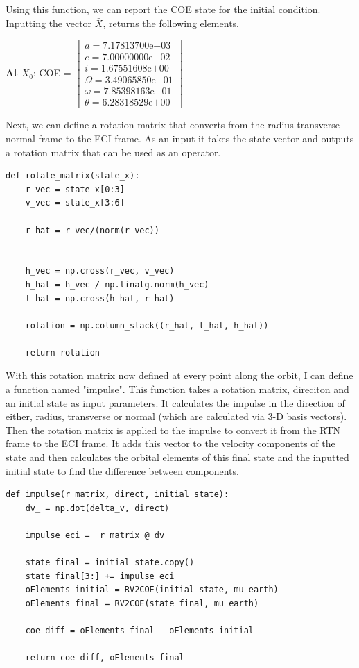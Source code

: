 \documentclass[12pt,twocolumn]{article}  %
\begin{document}
Using this function, we can report the COE state for the initial condition. Inputting the vector $\bar{X}$, returns the following elements.

\begin{center}
    \textbf{At } $X_0$:
    COE =
    $\begin{bmatrix}
    a = 7.17813700\mathrm{e}{+03} \\
    e =  7.00000000\mathrm{e}{-02} \\
    i = 1.67551608\mathrm{e}{+00} \\
    \Omega = 3.49065850\mathrm{e}{-01} \\
    \omega = 7.85398163\mathrm{e}{-01} \\
    \theta = 6.28318529\mathrm{e}{+00}
    \end{bmatrix}$  
\end{center}

Next, we can define a rotation matrix that converts from the radius-transverse-normal frame to the ECI frame.
As an input it takes the state vector and outputs a rotation matrix that can be used as an operator.
\begin{lstlisting}
def rotate_matrix(state_x):
    r_vec = state_x[0:3]
    v_vec = state_x[3:6]
    
    r_hat = r_vec/(norm(r_vec))
    

    h_vec = np.cross(r_vec, v_vec)
    h_hat = h_vec / np.linalg.norm(h_vec)  
    t_hat = np.cross(h_hat, r_hat)  

    rotation = np.column_stack((r_hat, t_hat, h_hat))
    
    return rotation
\end{lstlisting}

With this rotation matrix now defined at every point along the orbit, I can define a function named "impulse". This function
takes a rotation matrix, direciton and an initial state as input parameters. It calculates the impulse in the direction of either, 
radius, transverse or normal (which are calculated via 3-D basis vectors). Then the rotation matrix is applied to the impulse to convert
it from the RTN frame to the ECI frame. It adds this vector to the velocity components of the state and then calculates the orbital 
elements of this final state and the inputted initial state to find the difference between components. 
\begin{lstlisting}
def impulse(r_matrix, direct, initial_state):
    dv_ = np.dot(delta_v, direct)

    impulse_eci =  r_matrix @ dv_

    state_final = initial_state.copy()
    state_final[3:] += impulse_eci
    oElements_initial = RV2COE(initial_state, mu_earth)
    oElements_final = RV2COE(state_final, mu_earth)

    coe_diff = oElements_final - oElements_initial

    return coe_diff, oElements_final
\end{lstlisting}
\end{document}
